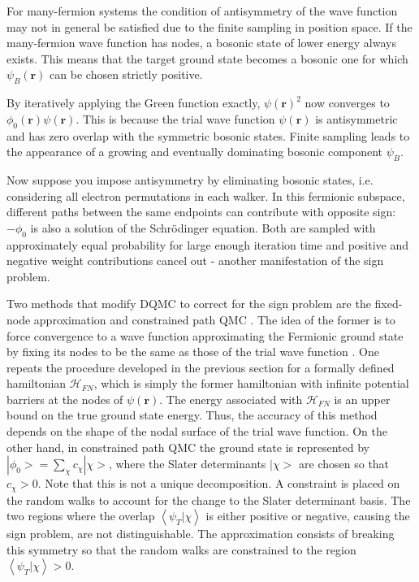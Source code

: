 \documentclass[10pt, twocolumn, twoside]{article}
\begin{document}
For many-fermion systems the condition of antisymmetry of the wave function may not in general be satisfied due to the finite sampling in position space. If the many-fermion wave function has nodes, a bosonic state of lower energy always exists. This means that the target ground state becomes a bosonic one for which $\psi_{B}(\bm r)$ can be chosen strictly positive.\par

By iteratively applying the Green function exactly, $\psi (\bm r)^2$ now converges to $\phi_0(\bm r) \psi (\bm r)$. This is because the trial wave function $\psi (\bm r) $ is antisymmetric and has zero overlap with the symmetric bosonic states. Finite sampling leads to the appearance of a growing and eventually dominating bosonic component $\psi_B$.\par

Now suppose you impose antisymmetry by eliminating bosonic states, i.e. considering all electron permutations in each walker. In this fermionic subspace, different paths between the same endpoints can contribute with opposite sign: $-\phi_0 $ is also a solution of the Schr\"odinger equation. Both are sampled with approximately equal probability for large enough iteration time and positive and negative weight contributions cancel out - another manifestation of the sign problem.\par

Two methods that modify DQMC to correct for the sign problem are the fixed-node approximation \cite{constrained2,vmc_review} and constrained path QMC \cite{constrained, constrained2}. The idea of the former is to force convergence to a wave function approximating the Fermionic ground state by fixing its nodes to be the same as those of the trial wave function \cite{vmc_review}. One repeats the procedure developed in the previous section for a formally defined hamiltonian $\mathcal{H}_{FN}$, which is simply the former hamiltonian with infinite potential barriers at the nodes of $\psi (\bm r)$. The energy associated with $\mathcal{H}_{FN}$ is an upper bound on the true ground state energy. Thus, the accuracy of this method depends on the shape of the nodal surface of the trial wave function. On the other hand, in constrained path QMC the ground state is represented by $|\phi_0 > = \sum_\chi c_\chi |\chi >$, where the Slater determinants $|\chi> $ are chosen so that $c_\chi > 0$. Note that this is not a unique decomposition. A constraint is placed on the random walks to account for the change to the Slater determinant basis. The two regions where the overlap $\left \langle \psi_T | \chi \right\rangle $ is either positive or negative, causing the sign problem, are not distinguishable. The approximation consists of breaking this symmetry so that the random walks are constrained to the region $\left \langle \psi_T | \chi \right\rangle > 0$.
\end{document}
